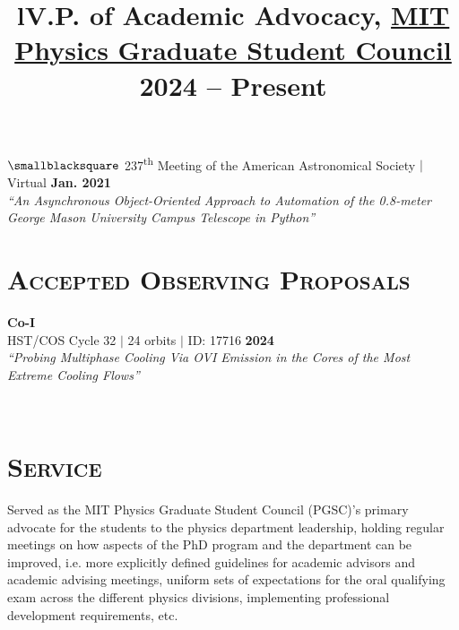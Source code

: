 \documentclass[marg, centered]{res}
\begin{document}
\begin{resume}
\begin{talks}[itemindent=0pt, leftmargin=19pt]
\item[\href{https://ui.adsabs.harvard.edu/abs/2021AAS...23734407R/abstract}{\color{dkbu}\small$\smallblacksquare$}] 237\textsuperscript{th} Meeting of the American Astronomical Society $|$ Virtual \hfill \textbf{Jan. 2021}\\
\textit{``An Asynchronous Object-Oriented Approach to Automation of the 0.8-meter George Mason University Campus Telescope in Python''}

\end{talks}


\section{{\scshape \bfseries Accepted Observing Proposals}}
\textbf{Co-I} \\
HST/COS Cycle 32 $|$ 24 orbits $|$ ID: 17716 \hfill \textbf{2024} \\
\textit{``Probing Multiphase Cooling Via OVI Emission in the Cores of the Most Extreme Cooling Flows''}


\begin{format}
\title{l} \\
\body
\end{format}

\section{{\scshape \bfseries Service}}

\title{\textbf{V.P. of Academic Advocacy}, \href{https://physics-gsc.scripts.mit.edu/home/}{\color{dkbu} MIT Physics Graduate Student Council} \hfill \textbf{2024 -- Present}}
\begin{position}
{\small Served as the MIT Physics Graduate Student Council (PGSC)'s primary advocate for the students to the physics department leadership, holding regular meetings on how aspects of the PhD program and the department can be improved, i.e. more explicitly defined guidelines for academic advisors and academic advising meetings, uniform sets of expectations for the oral qualifying exam across the different physics divisions, implementing professional development requirements, etc.}
\end{position}


\end{resume}
\end{document}
